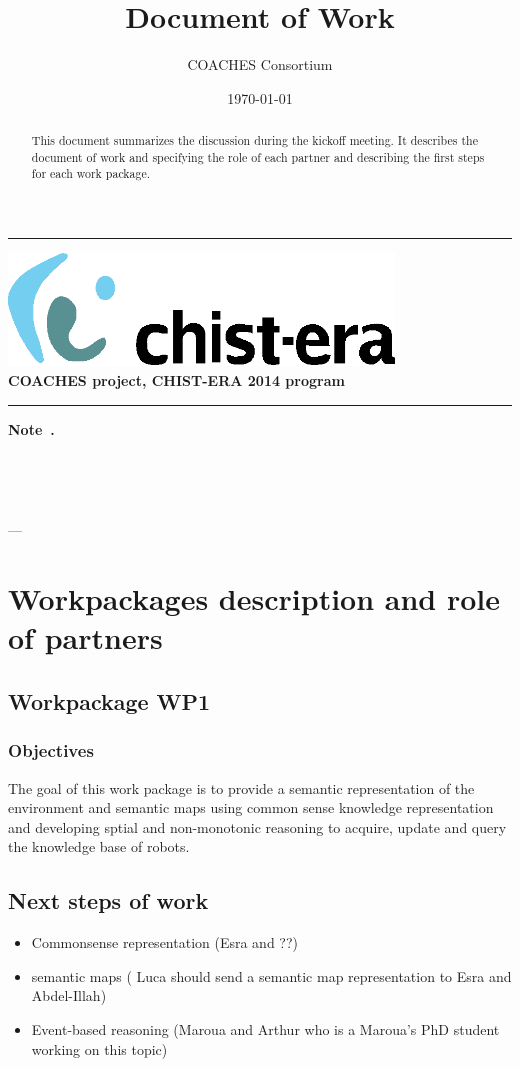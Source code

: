 \documentclass{article}
\title{ Document of Work }
\author{COACHES Consortium}
\date{\today}
\newcommand{\makemadtitle}{
  \hrule
  \vspace{.5em}
  \noindent
  \begin{center}
  \textbf{
  {\centering\includegraphics[height=3cm]{../logoCHISTERA2014.eps}}\\
   {\centering\Large COACHES project, CHIST-ERA 2014 program}
  }
  \end{center}
  \vspace{.5em}
 
  \hrule
  \vspace{3em}
  \begin{center}
    \begin{large}\textbf{ Note~\usebox{\notenumber}.}\end{large}\\[.5em]
    \begin{Large}\textbf{\usebox{\notetitle}}\end{Large}\\[2em]
    \begin{large}\usebox{\noteauthor} --- \usebox{\notedate}\end{large}
  \end{center}
  \vspace{3em}
}
\begin{document}
\makemadtitle

\vspace*{1.0in}
\begin{abstract}
 This document summarizes the discussion during the kickoff meeting. It describes the document of work and specifying the role of each partner and describing the first steps for each work package.
  \end{abstract}

\vspace*{1.5in}

\newpage

\section{Workpackages description and role of partners}
\subsection{Workpackage WP1}
\subsubsection*{Objectives}
The goal of this work package is to provide a semantic representation of the environment and semantic maps using common sense knowledge representation and developing sptial and non-monotonic reasoning to acquire, update and query the knowledge base of robots. 
\subsection*{Next steps of work}
\begin{itemize}
\item Commonsense representation (Esra and ??)
\item semantic maps ( Luca should send a semantic map representation to Esra and Abdel-Illah)
\item Event-based reasoning (Maroua and Arthur who is a Maroua's PhD student working on this topic)
\end{itemize}
\end{document}
